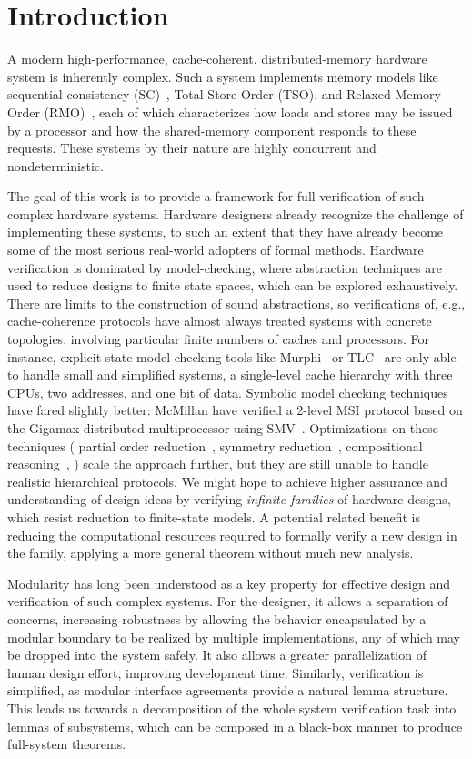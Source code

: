 \section{Introduction}
\label{sec:Introduction}

A modern high-performance, cache-coherent, distributed-memory hardware system is
inherently complex. Such a system implements memory models like sequential
consistency (SC)~\cite{lamport1979make}, Total Store Order (TSO), and
Relaxed Memory Order (RMO)~\cite{weaver1994sparc}, each
of which characterizes how loads and stores may be issued by a processor and
how the shared-memory component responds to these requests.  These systems by
their nature are highly concurrent and nondeterministic.

The goal of this work is to provide a framework for full verification of such
complex hardware systems. Hardware designers already recognize the challenge of
implementing these systems, to such an extent that they have already become some
of the most serious real-world adopters of formal methods.  Hardware
verification is dominated by model-checking, where abstraction techniques are
used to reduce designs to finite state spaces, which can be explored
exhaustively.  There are limits to the construction of sound abstractions, so
verifications of, e.g., cache-coherence protocols have almost always treated
systems with concrete topologies, involving particular finite numbers of caches
and processors. For instance, explicit-state model checking tools like
Murphi~\cite{murphi} or TLC~\cite{tlc} are only able to handle small and
simplified systems, \eg{} a single-level cache hierarchy with three CPUs, two
addresses, and one bit of data. Symbolic model checking techniques have fared
slightly better: McMillan \etal{} have verified a 2-level MSI protocol based on
the Gigamax distributed multiprocessor using SMV~\cite{gigamax}. Optimizations
on these techniques (\eg{} partial order reduction~\cite{part}, symmetry
reduction~\cite{sym1, sym2}, compositional reasoning~\cite{comp, Mccomp, mcc}, \etc{}) scale
the approach further, but they are still unable to handle realistic
hierarchical protocols. We might hope to achieve higher assurance and
understanding of design ideas by verifying \emph{infinite families} of hardware
designs, which resist reduction to finite-state models.  A potential related
benefit is reducing the computational resources required to formally verify a
new design in the family, applying a more general theorem without much new
analysis.

Modularity has long been understood as a key property for effective design and
verification of such complex systems. For the designer, it allows a separation
of concerns, increasing robustness by allowing the behavior encapsulated by a
modular boundary to be realized by multiple implementations, any of which may be
dropped into the system safely. It also allows a greater
parallelization of human design effort, improving development time. Similarly, verification is
simplified, as modular interface agreements provide a natural lemma structure.
This leads us towards a decomposition of the whole system verification
task into lemmas of subsystems, which can be composed in a black-box manner to
produce full-system theorems.

